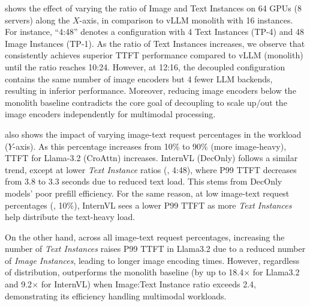 

 shows the effect of varying the ratio of Image and Text Instances on 64 GPUs (8 servers) along the $X$-axis, in comparison to vLLM monolith with 16 instances.
For instance, ``4:48'' denotes a configuration with 4 Text Instances (TP-4) and 48 Image Instances (TP-1).
As the ratio of Text Instances increases, we observe that \sysname{} consistently achieves superior TTFT performance compared to vLLM (monolith) until the ratio reaches 10:24.
However, at 12:16, the decoupled configuration contains the same number of image encoders but 4 fewer LLM backends, resulting in inferior performance.
Moreover, reducing image encoders below the monolith baseline contradicts the core goal of decoupling to scale up/out the image encoders independently for multimodal processing.

 also shows the impact of varying image-text request percentages in the workload ($Y$-axis).
As this percentage increases from 10\% to 90\% (more image-heavy), TTFT for Llama-3.2 (CroAttn) increases.
InternVL (DecOnly) follows a similar trend, except at lower \emph{Text Instance} ratios (\eg{}, 4:48), where P99 TTFT decreases from 3.8 to 3.3 seconds due to reduced text load.
This stems from DecOnly models' poor prefill efficiency.
For the same reason, at low image-text request percentages (\eg{}, 10\%), InternVL sees a lower P99 TTFT as more \emph{Text Instances} help distribute the text-heavy load.

On the other hand, across all image-text request percentages, increasing the number of \emph{Text Instances} raises P99 TTFT in Llama3.2 due to a reduced number of \emph{Image Instances}, leading to longer image encoding times.
However, regardless of distribution, \sysname{} outperforms the monolith baseline (by up to 18.4$\times$ for Llama3.2 and 9.2$\times$ for InternVL) when Image:Text Instance ratio exceeds 2.4, demonstrating its efficiency handling multimodal workloads.